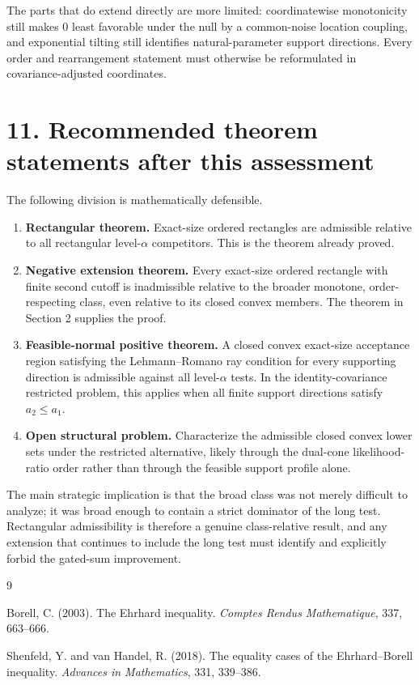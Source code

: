 \documentclass[12pt]{article}
\theoremstyle{definition}
\theoremstyle{remark}
\begin{document}
The parts that do extend directly are more limited: coordinatewise monotonicity still makes $0$ least favorable under the null by a common-noise location coupling, and exponential tilting still identifies natural-parameter support directions.  Every order and rearrangement statement must otherwise be reformulated in covariance-adjusted coordinates.

\section*{11. Recommended theorem statements after this assessment}

The following division is mathematically defensible.

\begin{enumerate}[label=(\roman*),leftmargin=2.2em]
\item \textbf{Rectangular theorem.}  Exact-size ordered rectangles are admissible relative to all rectangular level-$\alpha$ competitors.  This is the theorem already proved.

\item \textbf{Negative extension theorem.}  Every exact-size ordered rectangle with finite second cutoff is inadmissible relative to the broader monotone, order-respecting class, even relative to its closed convex members.  The theorem in Section 2 supplies the proof.

\item \textbf{Feasible-normal positive theorem.}  A closed convex exact-size acceptance region satisfying the Lehmann--Romano ray condition for every supporting direction is admissible against all level-$\alpha$ tests.  In the identity-covariance restricted problem, this applies when all finite support directions satisfy $a_2\le a_1$.

\item \textbf{Open structural problem.}  Characterize the admissible closed convex lower sets under the restricted alternative, likely through the dual-cone likelihood-ratio order rather than through the feasible support profile alone.
\end{enumerate}

The main strategic implication is that the broad class was not merely difficult to analyze; it was broad enough to contain a strict dominator of the long test.  Rectangular admissibility is therefore a genuine class-relative result, and any extension that continues to include the long test must identify and explicitly forbid the gated-sum improvement.

\begin{thebibliography}{9}

Borell, C. (2003).
The Ehrhard inequality.
\emph{Comptes Rendus Mathematique}, 337, 663--666.

Shenfeld, Y. and van Handel, R. (2018).
The equality cases of the Ehrhard--Borell inequality.
\emph{Advances in Mathematics}, 331, 339--386.

\end{thebibliography}
\end{document}
